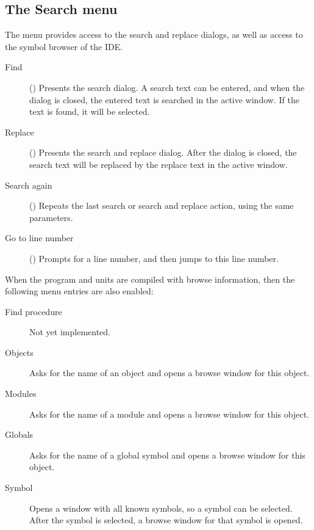 %
%
\subsection{The Search menu}
\label{se:menusearch}
The  menu provides access to the search and replace dialogs, as well as
access to the symbol browser of the IDE.
\begin{description}
\item[Find] () Presents the search dialog. A search text
can be entered, and when the dialog is closed, the entered text is searched
in the active window. If the text is found, it will be selected.
\item[Replace] () Presents the search and replace dialog.
After the dialog is closed, the search text will be replaced by the replace
text in the active window.
\item[Search again] () Repeats the last search or search and replace action,
 using  the same parameters.
\item[Go to line number] () Prompts for a line number, and
then jumps to this line number.
\end{description}
When the program and units are compiled with browse information, then
the following menu entries are also enabled:
\begin{description}
\item[Find procedure]
Not yet implemented.
\item[Objects]
Asks for the name of an object and opens a browse window for this object.
\item[Modules]
Asks for the name of a module and opens a browse window for this object.
\item[Globals]
Asks for the name of a global symbol and opens a browse window for this object.
\item[Symbol]
Opens a window with all known symbols, so a symbol can be selected. After
the symbol is selected, a browse window for that symbol is opened.
\end{description}
%
%
